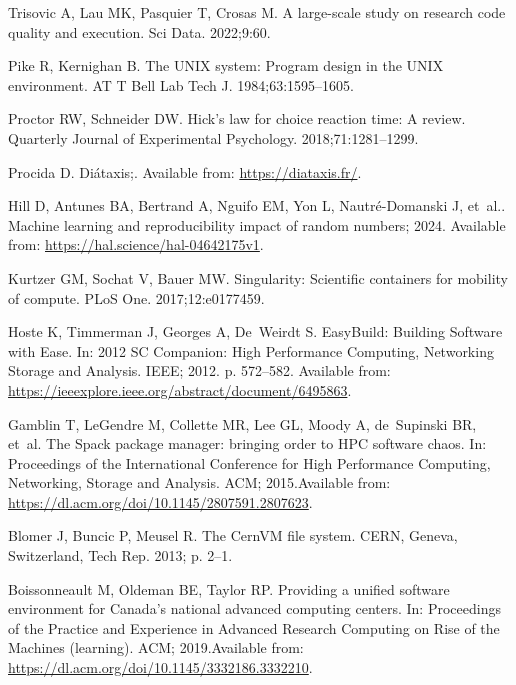 \documentclass[11pt]{article}
\begin{document}
\begin{thebibliography}{10}
Trisovic A, Lau MK, Pasquier T, Crosas M.
\newblock A large-scale study on research code quality and execution.
\newblock Sci Data. 2022;9:60.

Pike R, Kernighan B.
\newblock The {UNIX} system: Program design in the {UNIX} environment.
\newblock AT T Bell Lab Tech J. 1984;63:1595--1605.

Proctor RW, Schneider DW.
\newblock Hick’s law for choice reaction time: A review.
\newblock Quarterly Journal of Experimental Psychology. 2018;71:1281--1299.

Procida D. Diátaxis;.
\newblock Available from: \url{https://diataxis.fr/}.

Hill D, Antunes BA, Bertrand A, Nguifo EM, Yon L, Nautré-Domanski J, et~al..
  Machine learning and reproducibility impact of random numbers; 2024.
\newblock Available from: \url{https://hal.science/hal-04642175v1}.

Kurtzer GM, Sochat V, Bauer MW.
\newblock Singularity: Scientific containers for mobility of compute.
\newblock PLoS One. 2017;12:e0177459.

Hoste K, Timmerman J, Georges A, De~Weirdt S.
\newblock EasyBuild: Building Software with Ease.
\newblock In: 2012 SC Companion: High Performance Computing, Networking Storage
  and Analysis. IEEE; 2012. p. 572--582.
\newblock Available from:
  \url{https://ieeexplore.ieee.org/abstract/document/6495863}.

Gamblin T, LeGendre M, Collette MR, Lee GL, Moody A, de~Supinski BR, et~al.
\newblock The Spack package manager: bringing order to {HPC} software chaos.
\newblock In: Proceedings of the International Conference for High Performance
  Computing, Networking, Storage and Analysis. ACM; 2015.Available from:
  \url{https://dl.acm.org/doi/10.1145/2807591.2807623}.

Blomer J, Buncic P, Meusel R.
\newblock The {CernVM} file system.
\newblock CERN, Geneva, Switzerland, Tech Rep. 2013; p. 2--1.

Boissonneault M, Oldeman BE, Taylor RP.
\newblock Providing a unified software environment for Canada's national
  advanced computing centers.
\newblock In: Proceedings of the Practice and Experience in Advanced Research
  Computing on Rise of the Machines (learning). ACM; 2019.Available from:
  \url{https://dl.acm.org/doi/10.1145/3332186.3332210}.


\end{thebibliography}
\end{document}
